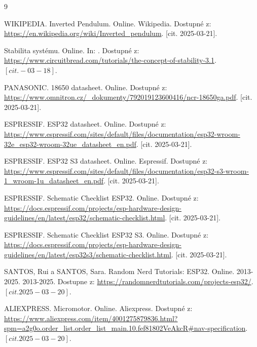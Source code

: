 

\begin{thebibliography}{9}

		WIKIPEDIA. Inverted Pendulum. Online. Wikipedia. Dostupné z: \url{https://en.wikipedia.org/wiki/Inverted_pendulum}. [cit. 2025-03-21].

		Stabilita systému. Online. In: . Dostupné z: \url{https://www.circuitbread.com/tutorials/the-concept-of-stability-3.1}. $\left[ cit. -03-18 \right].$


	PANASONIC. 18650 datasheet. Online. Dostupné z: \url{https://www.omnitron.cz/_dokumenty/792019123600416/ncr-18650ga.pdf}. [cit. 2025-03-21].

	
		ESPRESSIF. ESP32 datasheet. Online. Dostupné z: \url{https://www.espressif.com/sites/default/files/documentation/esp32-wroom-32e_esp32-wroom-32ue_datasheet_en.pdf}. [cit. 2025-03-21].

	
		ESPRESSIF. ESP32 S3 datasheet. Online. Espressif. Dostupné z: \url{https://www.espressif.com/sites/default/files/documentation/esp32-s3-wroom-1_wroom-1u_datasheet_en.pdf}. [cit. 2025-03-21].
	
	ESPRESSIF. Schematic Checklist ESP32. Online. Dostupné z: \url{https://docs.espressif.com/projects/esp-hardware-design-guidelines/en/latest/esp32/schematic-checklist.html}. [cit. 2025-03-21].
	
	ESPRESSIF. Schematic Checklist ESP32 S3. Online. Dostupné z: \url{https://docs.espressif.com/projects/esp-hardware-design-guidelines/en/latest/esp32s3/schematic-checklist.html}. [cit. 2025-03-21].
	
	SANTOS, Rui a SANTOS, Sara. Random Nerd Tutorials: ESP32. Online. 2013-2025. 2013-2025. Dostupne z: \url{https://randomnerdtutorials.com/projects-esp32/}. $\left[cit. 2025-03-20\right]$.

		ALIEXPRESS. Micromotor. Online. Aliexpress. Dostupné z: \url{https://www.aliexpress.com/item/4001275879836.html?spm=a2g0o.order_list.order_list_main.10.fef81802VeAkcR#nav-specification}. $\left[cit. 2025-03-20\right]$.


\end{thebibliography}
